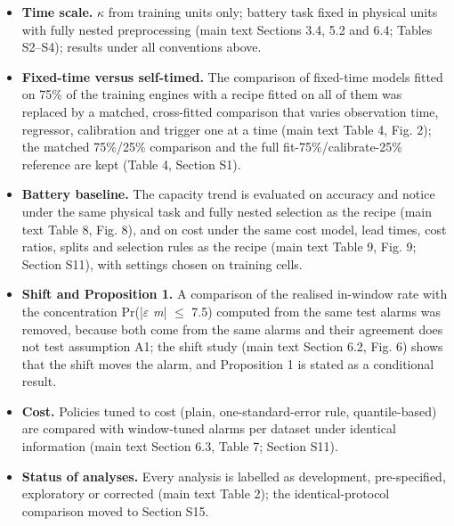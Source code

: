\documentclass[11pt,a4paper]{article}
\begin{document}
\begin{itemize}[leftmargin=1.2em,itemsep=2pt]
\item \textbf{Time scale.} $\kappa$ from training units only; battery task fixed in physical units with fully nested preprocessing (main text Sections 3.4, 5.2 and 6.4; Tables S2--S4); results under all conventions above.
\item \textbf{Fixed-time versus self-timed.} The comparison of fixed-time models fitted on 75\% of the training engines with a recipe fitted on all of them was replaced by a matched, cross-fitted comparison that varies observation time, regressor, calibration and trigger one at a time (main text Table 4, Fig. 2); the matched 75\%/25\% comparison and the full fit-75\%/calibrate-25\% reference are kept (Table 4, Section S1).
\item \textbf{Battery baseline.} The capacity trend is evaluated on accuracy and notice under the same physical task and fully nested selection as the recipe (main text Table 8, Fig. 8), and on cost under the same cost model, lead times, cost ratios, splits and selection rules as the recipe (main text Table 9, Fig. 9; Section S11), with settings chosen on training cells.
\item \textbf{Shift and Proposition 1.} A comparison of the realised in-window rate with the concentration Pr(|$\varepsilon$ \textminus{} \textit{m}| $\le$ 7.5) computed from the same test alarms was removed, because both come from the same alarms and their agreement does not test assumption A1; the shift study (main text Section 6.2, Fig. 6) shows that the shift moves the alarm, and Proposition 1 is stated as a conditional result.
\item \textbf{Cost.} Policies tuned to cost (plain, one-standard-error rule, quantile-based) are compared with window-tuned alarms per dataset under identical information (main text Section 6.3, Table 7; Section S11).
\item \textbf{Status of analyses.} Every analysis is labelled as development, pre-specified, exploratory or corrected (main text Table 2); the identical-protocol comparison moved to Section S15.
\end{itemize}
\end{document}
